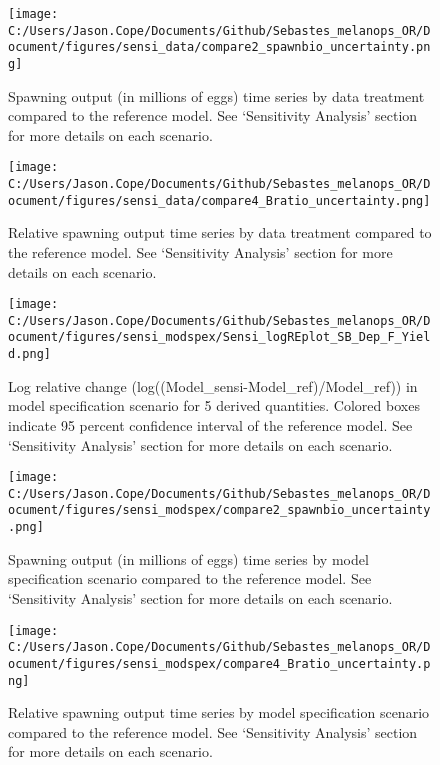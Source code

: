 \documentclass[11pt,
  english,
  letterpaper,
]{article}
\begin{document}
\newpage

\begin{figure}
\centering
\texttt{[image: C:/Users/Jason.Cope/Documents/Github/Sebastes\_melanops\_OR/Document/figures/sensi\_data/compare2\_spawnbio\_uncertainty.png]}
\caption{Spawning output (in millions of eggs) time series by data treatment compared to the reference model. See `Sensitivity Analysis' section for more details on each scenario.\label{fig:sensi-data-ssb}}
\end{figure}

\newpage

\begin{figure}
\centering
\texttt{[image: C:/Users/Jason.Cope/Documents/Github/Sebastes\_melanops\_OR/Document/figures/sensi\_data/compare4\_Bratio\_uncertainty.png]}
\caption{Relative spawning output time series by data treatment compared to the reference model. See `Sensitivity Analysis' section for more details on each scenario.\label{fig:sensi-data-depl}}
\end{figure}

\newpage

\begin{figure}
\centering
\texttt{[image: C:/Users/Jason.Cope/Documents/Github/Sebastes\_melanops\_OR/Document/figures/sensi\_modspex/Sensi\_logREplot\_SB\_Dep\_F\_Yield.png]}
\caption{Log relative change (log((Model\_sensi-Model\_ref)/Model\_ref)) in model specification scenario for 5 derived quantities. Colored boxes indicate 95 percent confidence interval of the reference model. See `Sensitivity Analysis' section for more details on each scenario.\label{fig:sensi-modspec-RE}}
\end{figure}

\newpage

\begin{figure}
\centering
\texttt{[image: C:/Users/Jason.Cope/Documents/Github/Sebastes\_melanops\_OR/Document/figures/sensi\_modspex/compare2\_spawnbio\_uncertainty.png]}
\caption{Spawning output (in millions of eggs) time series by model specification scenario compared to the reference model. See `Sensitivity Analysis' section for more details on each scenario.\label{fig:sensi-modspec-ssb}}
\end{figure}

\newpage

\begin{figure}
\centering
\texttt{[image: C:/Users/Jason.Cope/Documents/Github/Sebastes\_melanops\_OR/Document/figures/sensi\_modspex/compare4\_Bratio\_uncertainty.png]}
\caption{Relative spawning output time series by model specification scenario compared to the reference model. See `Sensitivity Analysis' section for more details on each scenario.\label{fig:sensi-modspec-depl}}
\end{figure}
\end{document}
